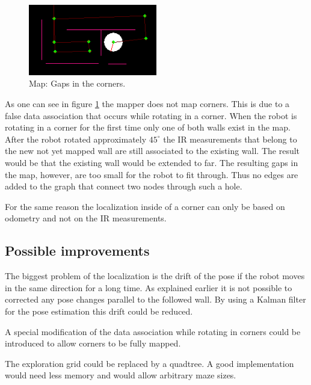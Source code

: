 \begin{figure}
\center
\includegraphics[width=0.5\textwidth]{figures/map_corners.png}
\caption{Map: Gaps in the corners.}
\label{fig:mapGaps}
\end{figure}

As one can see in figure \ref{fig:mapGaps} the mapper does not map corners. This is due to a false data association that occurs while rotating in a corner. When the robot is rotating in a corner for the first time only one of both walls exist in the map. After the robot rotated approximately $45^{\circ}$ the IR measurements that belong to the new not yet mapped wall are still associated to the existing wall. The result would be that the existing wall would be extended to far. The resulting gaps in the map, however, are too small for the robot to fit through. Thus no edges are added to the graph that connect two nodes through such a hole.

For the same reason the localization inside of a corner can only be based on odometry and not on the IR measurements.

\subsection{Possible improvements}

The biggest problem of the localization is the drift of the pose if the robot moves in the same direction for a long time. As explained earlier it is not possible to corrected any pose changes parallel to the followed wall. By using a Kalman filter for the pose estimation this drift could be reduced.

A special modification of the data association while rotating in corners could be introduced to allow corners to be fully mapped.

The exploration grid could be replaced by a quadtree. A good implementation would need less memory and would allow arbitrary maze sizes.



